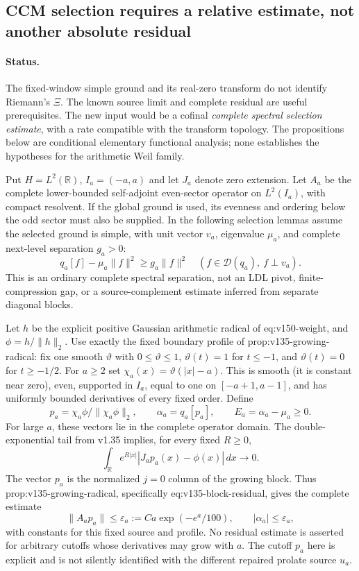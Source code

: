 
\subsection*{CCM selection requires a relative estimate, not another absolute residual}

\paragraph{Status.}
The fixed-window simple ground and its real-zero transform do not identify
Riemann's $\Xi$. The known source limit and complete residual are useful
prerequisites. The new input would be a cofinal \emph{complete spectral
selection estimate}, with a rate compatible with the transform topology.
The propositions below are conditional elementary functional analysis;
none establishes the hypotheses for the arithmetic Weil family.

Put $H=L^2(\mathbb R)$, $I_a=(-a,a)$ and let $J_a$ denote zero extension.
Let $A_a$ be the complete lower-bounded self-adjoint even-sector operator
on $L^2(I_a)$, with compact resolvent. If the global ground is used,
its evenness and ordering below the odd sector must also be supplied.
In the following selection lemmas assume the selected ground is simple,
with unit vector $v_a$, eigenvalue $\mu_a$, and complete next-level
separation $g_a>0$:
\[
 q_a[f]-\mu_a\|f\|^2\ge g_a\|f\|^2
 \quad(f\in\mathcal D(q_a),\ f\perp v_a).
\]
This is an ordinary complete spectral separation, not an LDL pivot,
finite-compression gap, or a source-complement estimate inferred from
separate diagonal blocks.

Let $h$ be the explicit positive Gaussian arithmetic radical of
\textup{eq:v150-weight}, and $\phi=h/\|h\|_2$. Use exactly the fixed
boundary profile of \textup{prop:v135-growing-radical}: fix one smooth
$\vartheta$ with $0\le\vartheta\le1$, $\vartheta(t)=1$ for $t\le-1$,
and $\vartheta(t)=0$ for $t\ge-1/2$. For $a\ge2$ set
$\chi_a(x)=\vartheta(|x|-a)$. This is smooth (it is constant near zero),
even, supported in $I_a$, equal to one on $[-a+1,a-1]$, and has
uniformly bounded derivatives of every fixed order. Define
\[
 p_a=\chi_a\phi/\|\chi_a\phi\|_2,\qquad
 \alpha_a=q_a[p_a],\qquad E_a=\alpha_a-\mu_a\ge0.
\]
For large $a$, these vectors lie in the complete operator domain.
The double-exponential tail from v1.35 implies, for every fixed $R\ge0$,
\[
 \int_{\mathbb R}e^{R|x|}|J_ap_a(x)-\phi(x)|\,dx\longrightarrow0.
\]
The vector $p_a$ is the normalized $j=0$ column of the growing block.
Thus \textup{prop:v135-growing-radical}, specifically
\textup{eq:v135-block-residual}, gives the complete estimate
\[
 \|A_ap_a\|\le\varepsilon_a:=Ca\exp(-e^a/100),\qquad
 |\alpha_a|\le\varepsilon_a,
\]
with constants for this fixed source and profile. No residual estimate
is asserted for arbitrary cutoffs whose derivatives may grow with $a$.
The cutoff $p_a$ here is explicit and is not silently identified with
the different repaired prolate source $u_a$.

